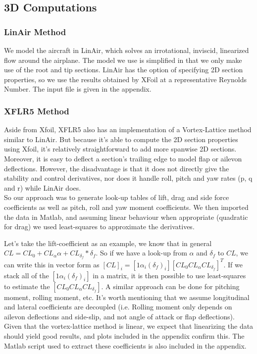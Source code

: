 \documentclass[titlepage,10pt]{article}
\begin{document}
\subsection{3D Computations}
\subsubsection{LinAir Method}
We model the aircraft in LinAir, which solves an irrotational, inviscid, linearized flow around the airplane. The model we use is simplified in that we only make use of the root and tip sections. LinAir has the option of specifying 2D section properties, so we use the results obtained by XFoil at a representative Reynolds Number. The input file is given in the appendix.

\subsubsection{XFLR5 Method}
Aside from Xfoil, XFLR5 also has an implementation of a Vortex-Lattice method similar to LinAir. But because it's able to compute the 2D section properties using Xfoil, it's relatively straightforward to add more spanwise 2D sections. Moreover, it is easy to deflect a section's trailing edge to model flap or ailevon deflections. However, the disadvantage is that it does not directly give the stability and control derivatives, nor does it handle roll, pitch and yaw rates (p, q and r) while LinAir does.\\

So our approach was to generate look-up tables of lift, drag and side force coefficients as well as  pitch, roll and yaw moment coefficients. We then imported the data in Matlab, and assuming linear behaviour when appropriate (quadratic for drag) we used least-squares to approximate the derivatives. 

Let's take the lift-coefficient as an example, we know that in general $CL = CL_0 + CL_{\alpha} \alpha + CL_{\delta_{f}} * \delta_f$. So if we have a look-up from $\alpha$ and $\delta_f$ to $CL$, we can write this in vector form as $\left[CL\right]_i =  \left[1 \alpha_i  (\delta_f)_i  \right] \left[ CL_0 CL_{\alpha} CL_{\delta_{f}}\right]^T$. If we stack all of the $\left[1 \alpha_i  (\delta_f)_i  \right]$ in a matrix, it is then possible to use least-squares to estimate the $\left[ CL_0 CL_{\alpha} CL_{\delta_{f}}\right]$. A similar approach can be done for pitching moment, rolling moment, etc. It's worth mentioning that we assume longitudinal and lateral coefficients are decoupled (i.e. Rolling moment only depends on ailevon deflections and side-slip, and not angle of attack or flap deflections). Given that the vortex-lattice method is linear, we expect that linearizing the data should yield good results, and plots included in the appendix confirm this. The Matlab script used to extract these coefficients is also included in the appendix. 
\end{document}
